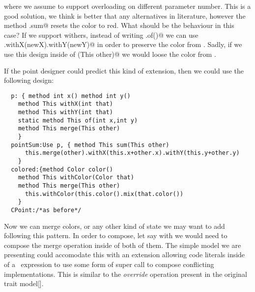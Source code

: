 where we assume to support overloading on different parameter number.
This is a good solution, we think is better that any alternatives in literature,
however the method \Q@CPoint.sum@ resets the color to red.
What should be the behaviour in this case?
If we support withers, instead of writing \Q@This.of()@ we can use
\Q@this.withX(newX).withY(newY)@ in order to preserve the color from \Q@this@.
Sadly, if we use this design inside of \Q@sum(This other)@ we would loose the color from \Q@other@.

If the point designer could predict this kind of extension, then we could use the following design:  
\begin{lstlisting}
  p: { method int x() method int y()
    method This withX(int that)
    method This withY(int that)
    static method This of(int x,int y)
    method This merge(This other)
    }
  pointSum:Use p, { method This sum(This other)
      this.merge(other).withX(this.x+other.x).withY(this.y+other.y)
    }
  colored:{method Color color()
    method This withColor(Color that)
    method This merge(This other)
      this.withColor(this.color().mix(that.color())
    }
  CPoint:/*as before*/
\end{lstlisting}  
  Now we can merge colors, or any other kind of state we may want to add
  following this pattern.
  In order to compose, let say \Q@colored@ with \Q@flavored@ we would
  need to compose the merge operation inside of both of them.
  The simple model we are presenting could accomodate this with an
  extension allowing code literals inside of a \use\ expression to use some form of super call to compose conflicting implementations. This is similar to the \emph{override} operation present in the original trait model[].
  
  